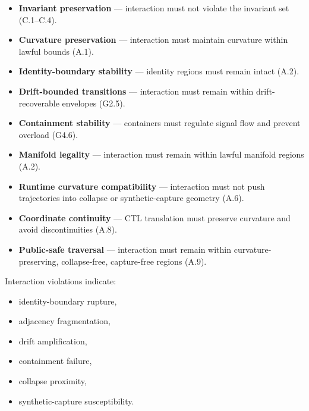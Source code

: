 \begin{itemize}
    \item \textbf{Invariant preservation} — interaction must not violate the
    invariant set (C.1–C.4).

    \item \textbf{Curvature preservation} — interaction must maintain curvature
    within lawful bounds (A.1).

    \item \textbf{Identity-boundary stability} — identity regions must remain
    intact (A.2).

    \item \textbf{Drift-bounded transitions} — interaction must remain within
    drift-recoverable envelopes (G2.5).

    \item \textbf{Containment stability} — containers must regulate signal flow
    and prevent overload (G4.6).

    \item \textbf{Manifold legality} — interaction must remain within lawful
    manifold regions (A.2).

    \item \textbf{Runtime curvature compatibility} — interaction must not push
    trajectories into collapse or synthetic-capture geometry (A.6).

    \item \textbf{Coordinate continuity} — CTL translation must preserve
    curvature and avoid discontinuities (A.8).

    \item \textbf{Public-safe traversal} — interaction must remain within
    curvature-preserving, collapse-free, capture-free regions (A.9).
\end{itemize}

\medskip

\noindent Interaction violations indicate:

\begin{itemize}
    \item identity-boundary rupture,
    \item adjacency fragmentation,
    \item drift amplification,
    \item containment failure,
    \item collapse proximity,
    \item synthetic-capture susceptibility.
\end{itemize}

